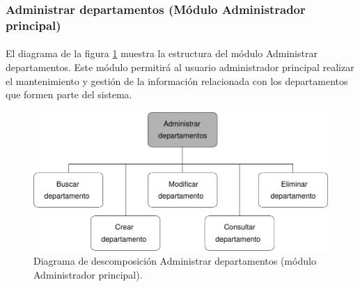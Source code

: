 \subsubsection{Administrar departamentos (Módulo Administrador principal)}

  \paragraph{}El diagrama de la figura
  \ref{diagramaDescomposicionAdministrarDepartamentos} muestra la estructura del
  módulo Administrar departamentos. Este módulo permitirá al usuario
  administrador principal realizar el mantenimiento y gestión de la información
  relacionada con los departamentos que formen parte del sistema.


  \begin{figure}[!ht]
    \begin{center}
      \includegraphics[]{11.Disenyo_Arquitectonico/11.2.Diagramas_Descomposicion/11.2.2.Modulo_administrador_principal/AdministrarBBDD/AdministrarDepartamentos/Diagramas/administrar_departamentos.pdf}
      \caption{Diagrama de descomposición Administrar departamentos (módulo Administrador principal).}
      \label{diagramaDescomposicionAdministrarDepartamentos}
    \end{center}
  \end{figure}
